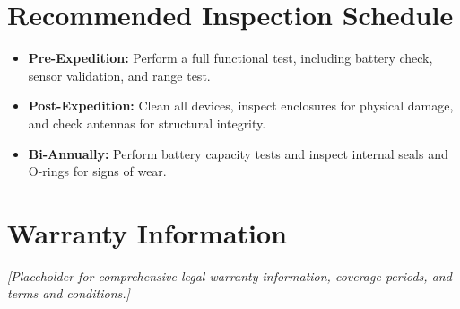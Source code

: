 \section{Recommended Inspection Schedule}
\label{sec:inspection-schedule}

\begin{itemize}
    \item \textbf{Pre-Expedition:} Perform a full functional test, including battery check, sensor validation, and range test.
    \item \textbf{Post-Expedition:} Clean all devices, inspect enclosures for physical damage, and check antennas for structural integrity.
    \item \textbf{Bi-Annually:} Perform battery capacity tests and inspect internal seals and O-rings for signs of wear.
\end{itemize}

\section{Warranty Information}
\label{sec:warranty-info}

\textit{[Placeholder for comprehensive legal warranty information, coverage periods, and terms and conditions.]}

